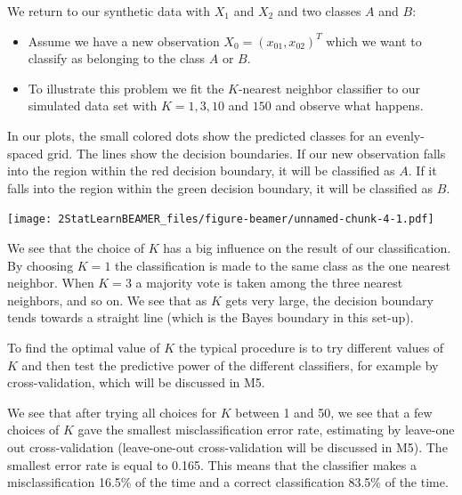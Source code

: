 \documentclass[ignorenonframetext,]{beamer}
\providecommand{\tightlist}{%
  \setlength{\itemsep}{0pt}\setlength{\parskip}{0pt}}
\begin{document}
\begin{frame}

We return to our synthetic data with \(X_1\) and \(X_2\) and two classes
\(A\) and \(B\):

\begin{itemize}
\tightlist
\item
  Assume we have a new observation \(X_0 = (x_{01}, x_{02})^T\) which we
  want to classify as belonging to the class \(A\) or \(B\).
\item
  To illustrate this problem we fit the \(K\)-nearest neighbor
  classifier to our simulated data set with \(K = 1, 3, 10\) and \(150\)
  and observe what happens.
\end{itemize}

In our plots, the small colored dots show the predicted classes for an
evenly-spaced grid. The lines show the decision boundaries. If our new
observation falls into the region within the red decision boundary, it
will be classified as \(A\). If it falls into the region within the
green decision boundary, it will be classified as \(B\).

\end{frame}

\begin{frame}

\texttt{[image: 2StatLearnBEAMER\_files/figure-beamer/unnamed-chunk-4-1.pdf]}

\end{frame}

\begin{frame}

We see that the choice of \(K\) has a big influence on the result of our
classification. By choosing \(K=1\) the classification is made to the
same class as the one nearest neighbor. When \(K=3\) a majority vote is
taken among the three nearest neighbors, and so on. We see that as \(K\)
gets very large, the decision boundary tends towards a straight line
(which is the Bayes boundary in this set-up).

To find the optimal value of \(K\) the typical procedure is to try
different values of \(K\) and then test the predictive power of the
different classifiers, for example by cross-validation, which will be
discussed in M5.

We see that after trying all choices for \(K\) between 1 and 50, we see
that a few choices of \(K\) gave the smallest misclassification error
rate, estimating by leave-one out cross-validation (leave-one-out
cross-validation will be discussed in M5). The smallest error rate is
equal to 0.165. This means that the classifier makes a misclassification
16.5\% of the time and a correct classification 83.5\% of the time.

\end{frame}
\end{document}
